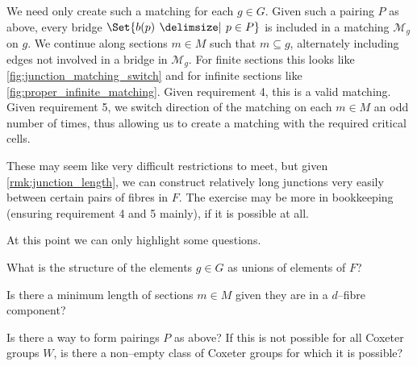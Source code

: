 \documentclass[class=article, crop=false]{standalone}
\begin{document}
We need only create such a matching for each $g \in G$. Given such a pairing $P$ as above, every bridge $\Set{b(p) \given p \in P}$ is included in a matching $\mathcal{M}_g$ on $g$. We continue along sections $m \in M$ such that $m \subseteq g$, alternately including edges not involved in a bridge in $\mathcal{M}_g$. For finite sections this looks like \cref{fig:junction_matching_switch} and for infinite sections like \cref{fig:proper_infinite_matching}. Given requirement 4, this is a valid matching. Given requirement 5, we switch direction of the matching on each $m \in M$ an odd number of times, thus allowing us to create a matching with the required critical cells.

These may seem like very difficult restrictions to meet, but given \cref{rmk:junction_length}, we can construct relatively long junctions very easily between certain pairs of fibres in $F$. The exercise may be more in bookkeeping (ensuring requirement 4 and 5 mainly), if it is possible at all.

At this point we can only highlight some questions.

\begin{question}
    What is the structure of the elements $g \in G$ as unions of elements of $F$?
\end{question}
\begin{question}
    Is there a minimum length of sections $m \in M$ given they are in a $d$--fibre component?
\end{question}
\begin{question}
    Is there a way to form pairings $P$ as above? If this is not possible for all Coxeter groups $W$, is there a non--empty class of Coxeter groups for which it is possible?
\end{question}
\end{document}
